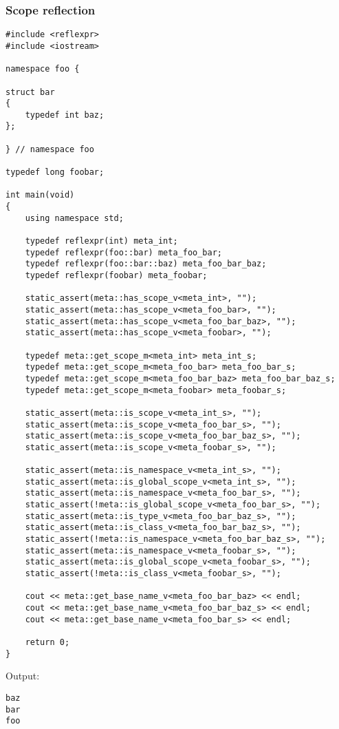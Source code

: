 \subsubsection{Scope reflection}

\begin{verbatim}
#include <reflexpr>
#include <iostream>

namespace foo {

struct bar
{
	typedef int baz;
};

} // namespace foo

typedef long foobar;

int main(void)
{
	using namespace std;

	typedef reflexpr(int) meta_int;
	typedef reflexpr(foo::bar) meta_foo_bar;
	typedef reflexpr(foo::bar::baz) meta_foo_bar_baz;
	typedef reflexpr(foobar) meta_foobar;

	static_assert(meta::has_scope_v<meta_int>, "");
	static_assert(meta::has_scope_v<meta_foo_bar>, "");
	static_assert(meta::has_scope_v<meta_foo_bar_baz>, "");
	static_assert(meta::has_scope_v<meta_foobar>, "");

	typedef meta::get_scope_m<meta_int> meta_int_s;
	typedef meta::get_scope_m<meta_foo_bar> meta_foo_bar_s;
	typedef meta::get_scope_m<meta_foo_bar_baz> meta_foo_bar_baz_s;
	typedef meta::get_scope_m<meta_foobar> meta_foobar_s;

	static_assert(meta::is_scope_v<meta_int_s>, "");
	static_assert(meta::is_scope_v<meta_foo_bar_s>, "");
	static_assert(meta::is_scope_v<meta_foo_bar_baz_s>, "");
	static_assert(meta::is_scope_v<meta_foobar_s>, "");

	static_assert(meta::is_namespace_v<meta_int_s>, "");
	static_assert(meta::is_global_scope_v<meta_int_s>, "");
	static_assert(meta::is_namespace_v<meta_foo_bar_s>, "");
	static_assert(!meta::is_global_scope_v<meta_foo_bar_s>, "");
	static_assert(meta::is_type_v<meta_foo_bar_baz_s>, "");
	static_assert(meta::is_class_v<meta_foo_bar_baz_s>, "");
	static_assert(!meta::is_namespace_v<meta_foo_bar_baz_s>, "");
	static_assert(meta::is_namespace_v<meta_foobar_s>, "");
	static_assert(meta::is_global_scope_v<meta_foobar_s>, "");
	static_assert(!meta::is_class_v<meta_foobar_s>, "");

	cout << meta::get_base_name_v<meta_foo_bar_baz> << endl;
	cout << meta::get_base_name_v<meta_foo_bar_baz_s> << endl;
	cout << meta::get_base_name_v<meta_foo_bar_s> << endl;

	return 0;
}
\end{verbatim}

Output:

\begin{verbatim}
baz
bar
foo
\end{verbatim}

